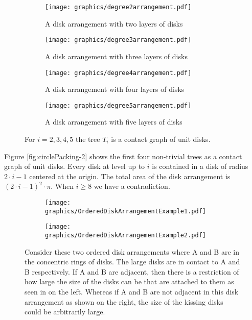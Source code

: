 \documentclass[10pt]{CSUNthesis}
\theoremstyle{plain}%
\theoremstyle{definition}
\theoremstyle{remark}
\begin{document}
\begin{figure}[!htpb]\label{fig:circlePacking-2}
\begin{center}
  \begin{subfigure}[b]{0.24\textwidth}
	  \texttt{[image: graphics/degree2arrangement.pdf]}
	  \caption{A disk arrangement with two layers of disks}
	  \label{fig:circlePacking2-1}
  \end{subfigure}
  \begin{subfigure}[b]{0.24\textwidth}
	  \texttt{[image: graphics/degree3arrangement.pdf]}
	  \caption{A disk arrangement with three layers of disks}
	  \label{fig:circlePacking2-2}
  \end{subfigure}
  \begin{subfigure}[b]{0.24\textwidth}
	  \texttt{[image: graphics/degree4arrangement.pdf]}
	  \caption{A disk arrangement with four layers of disks}
	  \label{fig:circlePacking2-3}
  \end{subfigure}
  \begin{subfigure}[b]{0.24\textwidth}
	  \texttt{[image: graphics/degree5arrangement.pdf]}
	  \caption{A disk arrangement with five layers of disks}
	  \label{fig:circlePacking2-4}
  \end{subfigure}
\end{center} 
\caption{For $i=2,3,4,5$ the tree $T_i$ is a contact graph of unit disks.}
\end{figure}
Figure \ref{fig:circlePacking-2} shows the first four non-trivial trees as a contact graph of unit disks.
Every disk at level up to $i$ is contained in a disk of radius $2\cdot i - 1$ centered at the origin.
The total area of the disk arrangement is $(2\cdot i -1)^2 \cdot \pi$. 
When $i\geq 8$ we have a contradiction.

\begin{figure}[!htbp]
\begin{center}
  \begin{subfigure}[b]{.48\textwidth}
  \begin{center}
	  \texttt{[image: graphics/OrderedDiskArrangementExample1.pdf]}
	  \label{fig:circlePacking3-1}
	  \end{center}
  \end{subfigure}
  \begin{subfigure}[b]{0.48\textwidth}
  \begin{center}
	  \texttt{[image: graphics/OrderedDiskArrangementExample2.pdf]}	  
	  \label{fig:circlePacking3-2}
	  \end{center}
  \end{subfigure}
  \caption{Consider these two ordered disk arrangements where A and B are in the concentric rings of disks.  The large disks are in contact to A and B respectively.  
  If A and B are adjacent, then there is a restriction of how large the size of the disks can be that are attached to them as seen in on the left.  
  Whereas if A and B are not adjacent in this disk arrangement as shown on the right, the size of the kissing disks could be arbitrarily large.}\label{fig:circlePacking-3}
\end{center} 
\end{figure}
\end{document}
